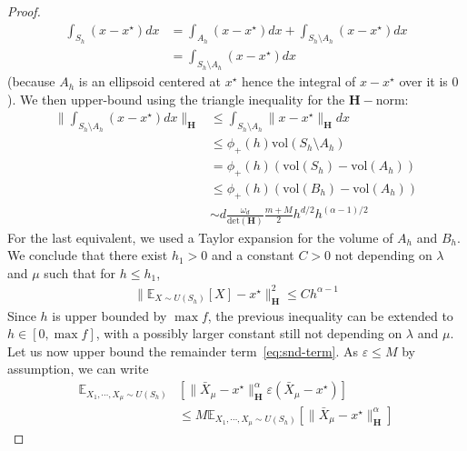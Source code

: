 \begin{proof}
\begin{align*}
\int_{S_{h}}(x-x^\star)dx & =\int_{A_{h}}(x-x^\star)dx+\int_{S_{h}\setminus A_{h}}(x-x^\star)dx\\
 & =\int_{S_{h}\setminus A_{h}}(x-x^\star)dx
\end{align*}
(because $A_{h}$ is an ellipsoid centered at $x^\star$ hence the integral of $x-x^\star$
over it is $0$). We then upper-bound using the triangle inequality for the $\mathbf{H}-$norm:
\begin{align*}
\lVert\int_{{S}_{h}\setminus A_{h}}(x-x^\star)dx\rVert_{\mathbf{H}} &\leq \int_{{S}_{h}\setminus A_{h}}\lVert x-x^\star\rVert_{\mathbf{H}} dx\\
& \le \phi_+(h)\mathrm{vol}({S}_{h}\setminus A_{h})\\
 & = \phi_+(h)(\mathrm{vol}({S}_{h})-\mathrm{vol}(A_{h}))\\
 &\leq \phi_+(h)(\mathrm{vol}(B_h)-\mathrm{vol}(A_h))\\
 & \sim d\frac{\omega_d}{\mathrm{det}(\mathbf{H})}\frac{m+M}{2}h^{d/2}h^{(\alpha-1)/2}
\end{align*}
For the last equivalent, we used a Taylor expansion for the volume of $A_h$ and $B_h$. We conclude that there exist $h_1>0$ and a constant $C>0$ not depending on $\lambda$ and $\mu$ such that for $h\leq h_1$,
\begin{align*}
\lVert\mathbb{E}_{X\sim U(S_{h})}\left[X\right]-x^\star\rVert^{2}_{\mathbf{H}} \leq C h^{\alpha-1}
\end{align*}
Since $h$ is upper bounded by $\max f$, the previous inequality can be extended to $h\in[0,\max f]$, with a possibly larger constant still not depending on $\lambda$ and $\mu$. Let us now upper bound the remainder term~\eqref{eq:snd-term}.
As $\varepsilon \leq M$ by assumption, we can write
\begin{align*}
\mathbb{E}_{X_{1},\cdots,X_{\mu}\sim U(S_{h})}&\left[\lVert\bar{X}_{\mu}-x^\star\rVert^{\alpha}_{\mathbf{H}}\varepsilon(\bar{X}_{\mu}-x^\star)\right]\\
&\le M\mathbb{E}_{X_{1},\cdots,X_{\mu}\sim U(S_{h})}\left[\lVert\bar{X}_{\mu}-x^\star\rVert^{\alpha}_{\mathbf{H}}\right]
\end{align*}


\end{proof}
